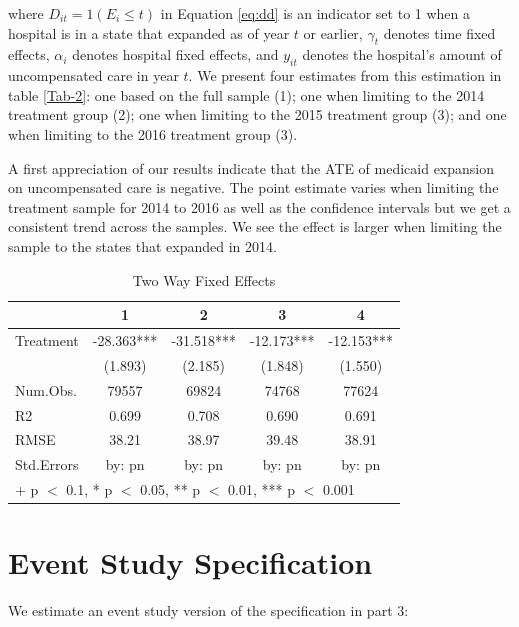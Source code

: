 \documentclass[
  12pt,
]{article}
\begin{document}
where \(D_{it}=1(E_{i}\leq t)\) in Equation \ref{eq:dd} is an indicator
set to 1 when a hospital is in a state that expanded as of year \(t\) or
earlier, \(\gamma_{t}\) denotes time fixed effects, \(\alpha_{i}\)
denotes hospital fixed effects, and \(y_{it}\) denotes the hospital's
amount of uncompensated care in year \(t\). We present four estimates
from this estimation in table \ref{Tab-2}: one based on the full sample
(1); one when limiting to the 2014 treatment group (2); one when
limiting to the 2015 treatment group (3); and one when limiting to the
2016 treatment group (3).

A first appreciation of our results indicate that the ATE of medicaid
expansion on uncompensated care is negative. The point estimate varies
when limiting the treatment sample for 2014 to 2016 as well as the
confidence intervals but we get a consistent trend across the samples.
We see the effect is larger when limiting the sample to the states that
expanded in 2014.

\begin{table}

\caption{\label{tab:Tab-2}Two Way Fixed Effects}
\centering
\begin{tabular}[t]{lcccc}
\toprule
  & 1 & 2 & 3 & 4\\
\midrule
Treatment & -28.363*** & -31.518*** & -12.173*** & -12.153***\\
 & (1.893) & (2.185) & (1.848) & (1.550)\\
\midrule
Num.Obs. & 79557 & 69824 & 74768 & 77624\\
R2 & 0.699 & 0.708 & 0.690 & 0.691\\
RMSE & 38.21 & 38.97 & 39.48 & 38.91\\
Std.Errors & by: pn & by: pn & by: pn & by: pn\\
\bottomrule
\multicolumn{5}{l}{\rule{0pt}{1em}+ p $<$ 0.1, * p $<$ 0.05, ** p $<$ 0.01, *** p $<$ 0.001}\\
\end{tabular}
\end{table}

\newpage

\hypertarget{event-study-specification}{%
\section{Event Study Specification}\label{event-study-specification}}

We estimate an event study version of the specification in part 3:
\end{document}
